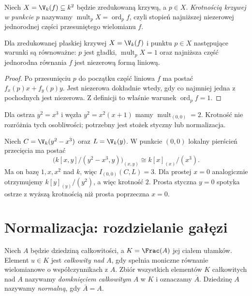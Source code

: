 \begin{definicja}
Niech $X=\V_k(f)\subseteq k^2$ będzie zredukowaną krzywą,
a $p\in X$. \emph{Krotnością krzywej w punkcie $p$}
nazywamy $\operatorname{mult}_pX=\operatorname{ord}_pf$,
czyli stopień najniższej niezerowej jednorodnej części
przesuniętego wielomianu $f$.
\end{definicja}

\begin{stwierdzenie}
Dla zredukowanej płaskiej krzywej $X=\V_k(f)$
i punktu $p\in X$ następujące warunki są równoważne:
$p$ jest gładki, $\operatorname{mult}_pX=1$ oraz
najniższa część jednorodna równania $f$ jest niezerową
formą liniową.
\end{stwierdzenie}
\begin{proof}
Po przesunięciu $p$ do początku część liniowa $f$
ma postać $f_x(p)x+f_y(p)y$. Jest niezerowa dokładnie wtedy,
gdy co najmniej jedna z pochodnych jest niezerowa.
Z definicji to właśnie warunek $\operatorname{ord}_pf=1$.
\end{proof}

\begin{przyklad}
Dla ostrza $y^2=x^3$ i węzła $y^2=x^2(x+1)$
mamy $\operatorname{mult}_{(0,0)}=2$.
Krotność nie rozróżnia tych osobliwości; potrzebny jest
stożek styczny lub normalizacja.
\end{przyklad}

\begin{przyklad}
Niech $C=\V_k(y^2-x^3)$ oraz $L=\V_k(y)$.
W punkcie $(0,0)$ lokalny pierścień przecięcia ma postać
\[
 \bigl(k[x,y]/(y^2-x^3,y)\bigr)_{(x,y)}
 \cong k[x]_{(x)}/(x^3).
\]
Ma on bazę $1,x,x^2$ nad $k$, więc
$I_{(0,0)}(C,L)=3$. Dla prostej $x=0$ analogicznie
otrzymujemy $k[y]_{(y)}/(y^2)$, a więc krotność $2$.
Prosta styczna $y=0$ spotyka ostrze z wyższą krotnością
niż prosta poprzeczna $x=0$.
\end{przyklad}

\section{Normalizacja: rozdzielanie gałęzi}

\begin{definicja}
Niech $A$ będzie dziedziną całkowitości, a
$K=\Frac(A)$ jej ciałem ułamków. Element $u\in K$
jest \emph{całkowity nad $A$}, gdy spełnia moniczne
równanie wielomianowe o współczynnikach z $A$.
Zbiór wszystkich elementów $K$ całkowitych nad $A$
nazywamy \emph{domknięciem całkowitym} $A$ w $K$
i oznaczamy $\overline A$. Dziedzinę $A$ nazywamy
\emph{normalną}, gdy $\overline A=A$.
\end{definicja}

